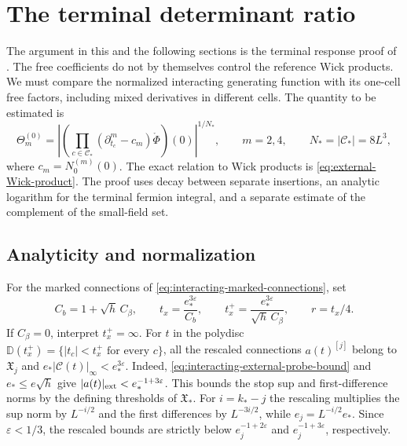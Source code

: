 \section{The terminal determinant ratio}
\label{sec:interacting-response}

The argument in this and the following sections is the terminal
response proof of \cite[\S23]{QED3Master}.
The free coefficients do not by themselves control the
reference Wick products. We must compare the normalized
interacting generating function with its one-cell free
factors, including mixed derivatives in different cells.
The quantity to be estimated is
\begin{equation}\label{eq:interacting-reference-error}
 \Theta_m^{(0)}=
 \left|\left(\prod_{c\in\mathcal C_*}
       (\partial_{t_c}^m-c_m)\mathring\Phi\right)(0)\right|^{1/N_*},
 \qquad m=2,4,\qquad N_*=|\mathcal C_*|=8L^3,
\end{equation}
where $c_m=N_0^{(m)}(0)$. The exact relation to Wick
products is \eqref{eq:external-Wick-product}.
The proof uses decay between separate insertions,
an analytic logarithm for the terminal fermion integral,
and a separate estimate of the complement of the
small-field set.

\subsection{Analyticity and normalization}
\label{subsec:interacting-determinant-ratio}

For the marked connections of
\eqref{eq:interacting-marked-connections}, set
\begin{equation}\label{eq:interacting-mark-radii}
 C_b=1+\sqrt h\,C_\beta,\qquad
 t_x=\frac{e_*^{3\varepsilon}}{C_b},\qquad
 t_x^+=\frac{e_*^{3\varepsilon}}{\sqrt h\,C_\beta},
 \qquad r=t_x/4.
\end{equation}
If $C_\beta=0$, interpret $t_x^+=\infty$.
For $t$ in the polydisc
$\mathbb D(t_x^+)=\{|t_c|<t_x^+\text{ for every }c\}$,
all the rescaled connections $a(t)^{[j]}$
belong to $\mathfrak X_j$ and
$e_*|\mathscr C(t)|_\infty<e_*^{3\varepsilon}$.
Indeed, \eqref{eq:interacting-external-probe-bound}
and $e_*\le e\sqrt h$ give
$|a(t)|_{\rm ext}<e_*^{-1+3\varepsilon}$.
This bounds the stop sup and first-difference
norms by the defining thresholds of $\mathfrak X_*$.
For $i=k_*-j$ the rescaling multiplies
the sup norm by $L^{-i/2}$ and the first
differences by $L^{-3i/2}$, while
$e_j=L^{-i/2}e_*$. Since
$\varepsilon<1/3$, the rescaled bounds are
strictly below $e_j^{-1+2\varepsilon}$ and
$e_j^{-1+3\varepsilon}$, respectively.

